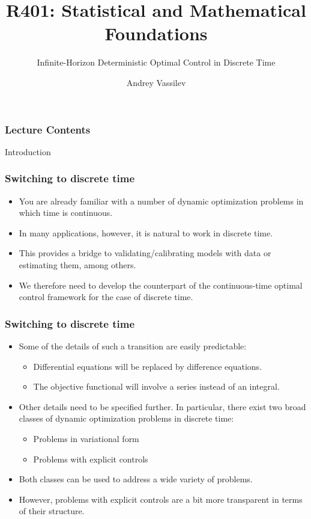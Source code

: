 \documentclass[10pt]{beamer}
\title{R401: Statistical and Mathematical Foundations \bigskip}
\subtitle{\textcolor{myred}{Infinite-Horizon Deterministic Optimal Control in Discrete Time}}
\author{Andrey Vassilev}
\date{}
\theoremstyle{definition}
\begin{document}
\maketitle



\begin{frame}[fragile]
\frametitle{Lecture Contents}
\tableofcontents
\end{frame}

\begin{section}{Introduction}\label{sec:intro}

\begin{frame}[fragile]
\frametitle{Switching to discrete time}
\begin{itemize}\itemsep1em
\item You are already familiar with a number of dynamic optimization problems in which time is continuous.
\item In many applications, however, it is natural to work in discrete time.
\item This provides a bridge to validating/calibrating models with data or estimating them, among others.
\item We therefore need to develop the counterpart of the continuous-time optimal control framework for the case of discrete time.
\end{itemize}
\end{frame}

\begin{frame}[fragile]
\frametitle{Switching to discrete time}
\begin{itemize}\itemsep1em
\item Some of the details of such a transition are easily predictable:
	\begin{itemize}
	\item Differential equations will be replaced by difference equations.
	\item The objective functional will involve a series instead of an integral.
	\end{itemize}
\item Other details need to be specified further. In particular, there exist two broad classes of dynamic optimization problems in discrete time:
	\begin{itemize}
	\item Problems in variational form
	\item Problems with explicit controls
	\end{itemize}
\item Both classes can be used to address a wide variety of problems. 
\item However, problems with explicit controls are a bit more transparent in terms of their structure.
\end{itemize}
\end{frame}


\end{section}
\end{document}
